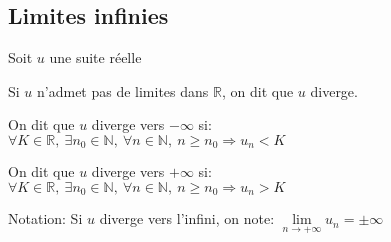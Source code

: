 \documentclass[12pt,twoside,a4paper]{article}
\begin{document}
		\subsection{Limites infinies}
			\begin{defi}
				Soit $u$ une suite r\'eelle
				\begin{liste}
					\item Si $u$ n'admet pas de limites dans $\mathbb{R}$, on dit que $u$ diverge.
					\item On dit que $u$ diverge vers $-\infty$ si:\\
						$\forall K\in\mathbb{R},\ \exists n_0\in\mathbb{N},\ \forall n\in\mathbb{N},\ n\geqslant n_0\Rightarrow u_n<K$
					\item On dit que $u$ diverge vers $+\infty$ si:\\
						$\forall K\in\mathbb{R},\ \exists n_0\in\mathbb{N},\ \forall n\in\mathbb{N},\ n\geqslant n_0\Rightarrow u_n>K$
				\end{liste}
			\end{defi}
			Notation: Si $u$ diverge vers l'infini, on note: $\lim\limits_{n\rightarrow+\infty}u_n=\pm\infty$
\end{document}
